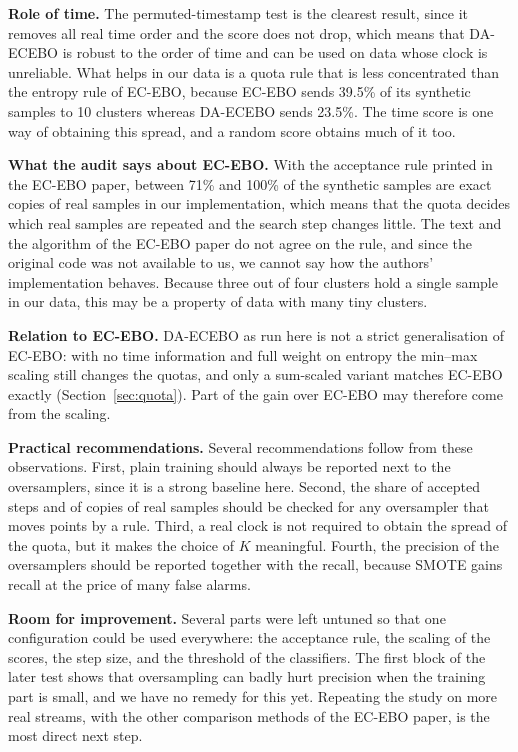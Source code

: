 \documentclass[preprint,10pt]{elsarticle}
\begin{document}
\textbf{Role of time.} \quad The permuted-timestamp test is the clearest result, since it removes all real time order and the score does not drop, which means that DA-ECEBO is robust to the order of time and can be used on data whose clock is unreliable. What helps in our data is a quota rule that is less concentrated than the entropy rule of EC-EBO, because EC-EBO sends 39.5\% of its synthetic samples to 10 clusters whereas DA-ECEBO sends 23.5\%. The time score is one way of obtaining this spread, and a random score obtains much of it too.

\textbf{What the audit says about EC-EBO.} \quad With the acceptance rule printed in the EC-EBO paper, between 71\% and 100\% of the synthetic samples are exact copies of real samples in our implementation, which means that the quota decides which real samples are repeated and the search step changes little. The text and the algorithm of the EC-EBO paper do not agree on the rule, and since the original code was not available to us, we cannot say how the authors' implementation behaves. Because three out of four clusters hold a single sample in our data, this may be a property of data with many tiny clusters.

\textbf{Relation to EC-EBO.} \quad DA-ECEBO as run here is not a strict generalisation of EC-EBO: with no time information and full weight on entropy the min--max scaling still changes the quotas, and only a sum-scaled variant matches EC-EBO exactly (Section~\ref{sec:quota}). Part of the gain over EC-EBO may therefore come from the scaling.

\textbf{Practical recommendations.} \quad Several recommendations follow from these observations. First, plain training should always be reported next to the oversamplers, since it is a strong baseline here. Second, the share of accepted steps and of copies of real samples should be checked for any oversampler that moves points by a rule. Third, a real clock is not required to obtain the spread of the quota, but it makes the choice of $K$ meaningful. Fourth, the precision of the oversamplers should be reported together with the recall, because SMOTE gains recall at the price of many false alarms.

\textbf{Room for improvement.} \quad Several parts were left untuned so that one configuration could be used everywhere: the acceptance rule, the scaling of the scores, the step size, and the threshold of the classifiers. The first block of the later test shows that oversampling can badly hurt precision when the training part is small, and we have no remedy for this yet. Repeating the study on more real streams, with the other comparison methods of the EC-EBO paper, is the most direct next step.
\end{document}
